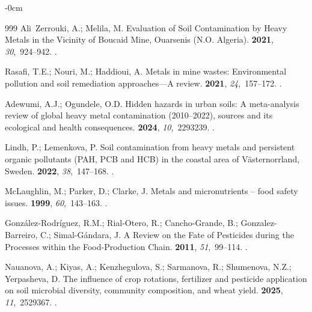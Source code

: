 \documentclass[environremediat,article,accept,pdftex,oneauthor]{Definitions/mdpi}
\begin{document}
\begin{adjustwidth}{-\extralength}{0cm}
\begin{thebibliography}{999}
Ali~Zerrouki, A.; Melila, M.
\newblock Evaluation of Soil Contamination by Heavy Metals in the Vicinity of
  Boucaid Mine, Ouarsenis (N.O. Algeria).
 {\bf
  2021}, {\em 30},~924--942.
.

Rasafi, T.E.; Nouri, M.; Haddioui, A.
\newblock Metals in mine wastes: Environmental pollution and soil remediation
  approaches---A review.
 {\bf 2021}, {\em 24},~157--172.
.

Adewumi, A.J.; Ogundele, O.D.
\newblock Hidden hazards in urban soils: A meta-analysis review of global heavy
  metal contamination (2010--2022), sources and its ecological and health
  consequences.
 {\bf 2024}, {\em 10},~2293239.
.

Lindh, P.; Lemenkova, P.
\newblock Soil contamination from heavy metals and persistent organic
  pollutants (PAH, PCB and HCB) in the coastal area of V{\"a}sternorrland,
  Sweden.
 {\bf 2022}, {\em 38},~147--168.
.

McLaughlin, M.; Parker, D.; Clarke, J.
\newblock Metals and micronutrients -- food safety issues.
 {\bf 1999}, {\em 60},~143--163.
.

Gonz{\'a}lez-Rodr{\'i}guez, R.M.; Rial-Otero, R.; Cancho-Grande, B.;
  Gonzalez-Barreiro, C.; Simal-G{\'a}ndara, J.
\newblock A Review on the Fate of Pesticides during the Processes within the
  Food-Production Chain.
 {\bf 2011}, {\em
  51},~99--114.
.

Nauanova, A.; Kiyas, A.; Kenzhegulova, S.; Sarmanova, R.; Shumenova, N.Z.; Yerpasheva, D.
\newblock The influence of crop rotations, fertilizer and pesticide application
  on soil microbial diversity, community composition, and wheat yield.
 {\bf 2025}, {\em 11},~2529367.
.


\end{thebibliography}
\end{adjustwidth}
\end{document}
